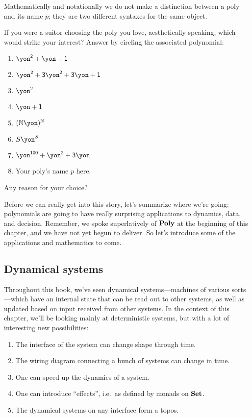 \documentclass[DynamicalBook]{subfiles}
\begin{document}
Mathematically and notationally we do not make a distinction between a poly and its name $p$; they are two different syntaxes for the same object. 


\begin{exercise}
If you were a suitor choosing the poly you love, aesthetically speaking, which would strike your interest? Answer by circling the associated polynomial:
\begin{enumerate}
	\item $\yon^\2+\yon+\1$
	\item $\yon^\2+\3\yon^\2+\3\yon+\1$
	\item $\yon^\2$
	\item $\yon+\1$
	\item $(\nn\yon)^\nn$
	\item $S\yon^S$
	\item $\yon^{\1\0\0}+\yon^\2+\3\yon$
	\item Your poly's name $p$ here.
\end{enumerate}
Any reason for your choice?
\end{exercise}

Before we can really get into this story, let's summarize where we're going: polynomials are going to have really surprising applications to dynamics, data, and decision. Remember, we spoke superlatively of $\textbf{Poly}$ at the beginning of this chapter,
and we have not yet begun to deliver. So let's introduce some of the applications and mathematics to come.

\subsection{Dynamical systems}

Throughout this book, we've seen dynamical systems---machines of various sorts---which have an internal state that can be read out to other systems, as well as updated based on input received from other systems. In the context of this chapter, we'll be looking mainly at deterministic systems, but with a lot of interesting new possibilities:
\begin{enumerate}
	\item The interface of the system can change shape through time.
	\item The wiring diagram connecting a bunch of systems can change in time.
	\item One can speed up the dynamics of a system.
	\item One can introduce ``effects'', i.e.\ as defined by monads on $\textbf{Set}$.
	\item The dynamical systems on any interface form a topos.
\end{enumerate}
\end{document}

